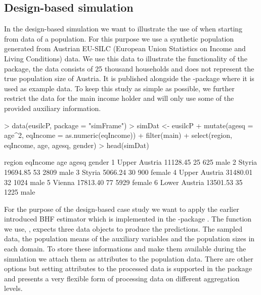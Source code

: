 \documentclass[article]{ajs}
\begin{document}
\subsection{Design-based simulation}

In the design-based simulation we want to illustrate the use of  when starting from data of a population. For this purpose we use a synthetic population generated from Austrian EU-SILC (European Union Statistics on Income and Living Conditions) data. We use this data to illustrate the functionality of the package, the data consists of 25 thousand households and does not represent the true population size of Austria. It is published alongside the -package  \citep{alfons10} where it is used as example data. To keep this study as simple as possible, we further restrict the data for the main income holder and will only use some of the provided auxiliary information.

\begin{Schunk}
\begin{Sinput}
> data(eusilcP, package = "simFrame")
> simDat <- eusilcP %
+   mutate(agesq = age^2, eqIncome = as.numeric(eqIncome)) %
+   filter(main) %
+   select(region, eqIncome, age, agesq, gender)
> head(simDat)
\end{Sinput}
\begin{Soutput}
         region eqIncome age agesq gender
1 Upper Austria 11128.45  25   625   male
2        Styria 19694.85  53  2809   male
3        Styria  5066.24  30   900 female
4 Upper Austria 31480.01  32  1024   male
5        Vienna 17813.40  77  5929 female
6 Lower Austria 13501.53  35  1225   male
\end{Soutput}
\end{Schunk}

For the purpose of the design-based case study we want to apply the earlier introduced BHF estimator which is implemented in the -package  \citep{molina13}. The function we use, , expects three data objects to produce the predictions. The sampled data, the population means of the auxiliary variables and the population sizes in each domain. To store these informations and make them available during the simulation we attach them as attributes to the population data. There are other options but setting attributes to the processed data is supported in the package and presents a very flexible form of processing data on different aggregation levels. 
\end{document}
